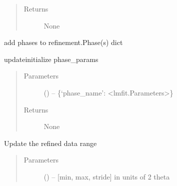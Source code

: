\documentclass[letterpaper,10pt,english]{sphinxmanual}
\begin{document}
\begin{fulllineitems}
\begin{fulllineitems}
\begin{quote}
\begin{description}
\item[{Returns}] \leavevmode
None

\end{description}\end{quote}

\end{fulllineitems}


\begin{fulllineitems}
\label{\detokenize{rst/refinement:mstack.refinement.Refinement.update_phase}}
add phases to refinement.Phase(s) dict

\end{fulllineitems}


\begin{fulllineitems}
\label{\detokenize{rst/refinement:mstack.refinement.Refinement.update_phase_params}}
update\textbar{}initialize phase\_params
\begin{quote}\begin{description}
\item[{Parameters}] \leavevmode
{} () -- \{`phase\_name': \textless{}lmfit.Parameters\textgreater{}\}

\item[{Returns}] \leavevmode
None

\end{description}\end{quote}

\end{fulllineitems}


\begin{fulllineitems}
\label{\detokenize{rst/refinement:mstack.refinement.Refinement.update_theta_range}}
Update the refined data range
\begin{quote}\begin{description}
\item[{Parameters}] \leavevmode
{} () -- {[}min, max, stride{]} in units of 2 theta


\end{description}
\end{quote}
\end{fulllineitems}
\end{fulllineitems}
\end{document}
